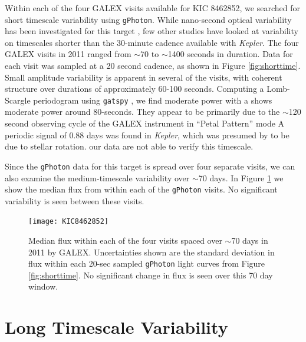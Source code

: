 \documentclass[twocolumn]{aastex6}
\newcommand{\Kepler}{\textsl{Kepler}\xspace}
\begin{document}
Within each of the four GALEX visits available for KIC 8462852, we searched for short timescale variability using {\tt gPhoton}. While nano-second optical variability has been investigated for this target \citep{abeysekara2016}, few other studies have looked at variability on timescales shorter than the 30-minute cadence available with \Kepler.
The four GALEX visits in 2011 ranged from $\sim$70 to $\sim$1400 seconds in duration. Data for each visit was sampled at a 20 second cadence, as shown in Figure \ref{fig:shorttime}. Small amplitude variability is apparent in several of the visits, with coherent structure over durations of approximately 60-100 seconds. Computing a Lomb-Scargle periodogram using {\tt gatspy} \citep{gatspy}, we find moderate power with a shows moderate power around 80-seconds. They appear to be primarily due to the $\sim$120 second observing cycle of the GALEX instrument in ``Petal Pattern'' mode 
A periodic signal of 0.88 days was found in \Kepler, which was presumed by \citet{boyajian2015} to be due to stellar rotation. our data are not able to verify this timescale.




Since the {\tt gPhoton} data for this target is spread over four separate visits, we can also examine the medium-timescale variability over $\sim$70 days. In Figure \ref{fig:medtime} we show the median flux from within each of the {\tt gPhoton} visits. No significant variability is seen between these visits.


\begin{figure}[!ht]
\centering
\texttt{[image: KIC8462852]}
\caption{Median flux within each of the four visits spaced over $\sim$70 days in 2011 by GALEX. Uncertainties shown are the standard deviation in flux within each 20-sec sampled {\tt gPhoton} light curves from Figure \ref{fig:shorttime}. No significant change in flux is seen over this 70 day window.
}
\label{fig:medtime}
\end{figure}





\section{Long Timescale Variability}
\label{sec:long}
\end{document}
